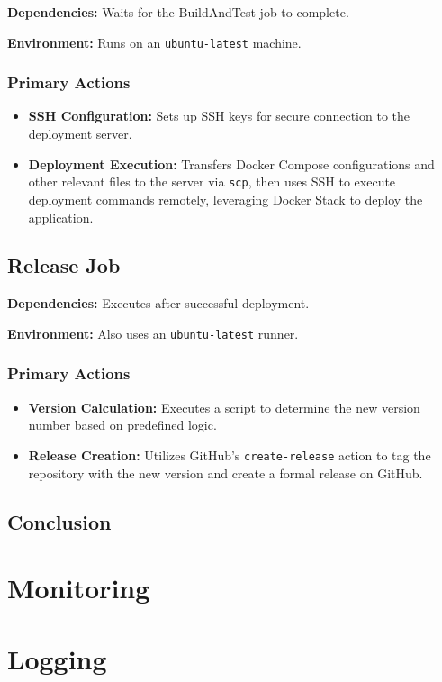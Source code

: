 \documentclass[12pt, a4paper]{book}
\begin{document}
\textbf{Dependencies:} Waits for the BuildAndTest job to complete.

\textbf{Environment:} Runs on an \texttt{ubuntu-latest} machine.

\subsubsection{Primary Actions}
\begin{itemize}
    \item \textbf{SSH Configuration:} Sets up SSH keys for secure connection to the deployment server.
    \item \textbf{Deployment Execution:} Transfers Docker Compose configurations and other relevant files to the server via \texttt{scp}, then uses SSH to execute deployment commands remotely, leveraging Docker Stack to deploy the application.
\end{itemize}

\subsection{Release Job}

\textbf{Dependencies:} Executes after successful deployment.

\textbf{Environment:} Also uses an \texttt{ubuntu-latest} runner.

\subsubsection{Primary Actions}
\begin{itemize}
    \item \textbf{Version Calculation:} Executes a script to determine the new version number based on predefined logic.
    \item \textbf{Release Creation:} Utilizes GitHub's \texttt{create-release} action to tag the repository with the new version and create a formal release on GitHub.
\end{itemize}


\subsection{Conclusion}


\section{Monitoring}

\section{Logging}
\end{document}
